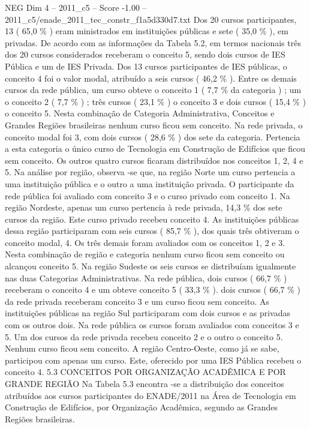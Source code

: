 \begin{textsample}{NEG Dim 4 – 2011\_c5 – Score -1.00 – 2011\_c5/enade\_2011\_tec\_constr\_f1a5d330d7.txt}
Dos 20 cursos participantes, 13 ( 65,0 \% ) eram ministrados em instituições públicas e sete ( 35,0 \% ), em privadas.
De acordo com as informações da Tabela 5.2, em termos nacionais três dos 20 cursos considerados receberam o conceito 5, sendo dois cursos de IES Pública e um de IES Privada.
Dos 13 cursos participantes de IES públicas, o conceito 4 foi o valor modal, atribuído a seis cursos ( 46,2 \% ).
Entre os demais cursos da rede pública, um curso obteve o conceito 1 ( 7,7 \% da categoria ) ; um o conceito 2 ( 7,7 \% ) ; três cursos ( 23,1 \% ) o conceito 3 e dois cursos ( 15,4 \% ) o conceito 5.
Nesta combinação de Categoria Administrativa, Conceitos e Grandes Regiões brasileiras nenhum curso ficou sem conceito.
Na rede privada, o conceito modal foi 3, com dois cursos ( 28,6 \% ) dos sete da categoria.
Pertencia a esta categoria o único curso de Tecnologia em Construção de Edifícios que ficou sem conceito.
Os outros quatro cursos ficaram distribuídos nos conceitos 1, 2, 4 e 5.
Na análise por região, observa -se que, na região Norte um curso pertencia a uma instituição pública e o outro a uma instituição privada.
O participante da rede pública foi avaliado com conceito 3 e o curso privado com conceito 1.
Na região Nordeste, apenas um curso pertencia à rede privada, 14,3 \% dos sete cursos da região.
Este curso privado recebeu conceito 4.
As instituições públicas dessa região participaram com seis cursos ( 85,7 \% ), dos quais três obtiveram o conceito modal, 4.
Os três demais foram avaliados com os conceitos 1, 2 e 3.
Nesta combinação de região e categoria nenhum curso ficou sem conceito ou alcançou conceito 5.
Na região Sudeste os seis cursos se distribuíam igualmente nas duas Categorias Administrativas.
Na rede pública, dois cursos ( 66,7 \% ) receberam o conceito 4 e um obteve conceito 5 ( 33,3 \% ). dois cursos ( 66,7 \% ) da rede privada receberam conceito 3 e um curso ficou sem conceito.
As instituições públicas na região Sul participaram com dois cursos e as privadas com os outros dois.
Na rede pública os cursos foram avaliados com conceitos 3 e 5.
Um dos cursos da rede privada recebeu conceito 2 e o outro o conceito 5.
Nenhum curso ficou sem conceito.
A região Centro-Oeste, como já se sabe, participou com apenas um curso.
Este, oferecido por uma IES Pública recebeu o conceito 4. 5.3 CONCEITOS POR ORGANIZAÇÃO ACADÊMICA E POR GRANDE REGIÃO Na Tabela 5.3 encontra -se a distribuição dos conceitos atribuídos aos cursos participantes do ENADE/2011 na Área de Tecnologia em Construção de Edifícios, por Organização Acadêmica, segundo as Grandes Regiões brasileiras.

\end{textsample}
